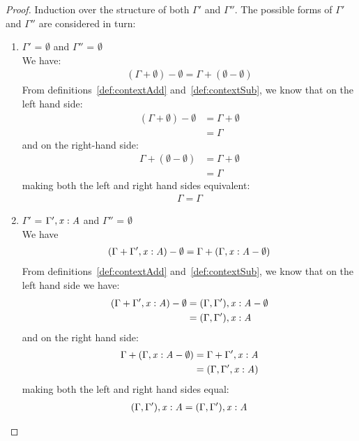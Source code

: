 \begin{proof}
  Induction over the structure of both $\Gamma'$ and $\Gamma''$. The possible forms of
  $\Gamma'$ and $\Gamma''$ are considered in turn:
  \begin{enumerate}
    \item $\Gamma'$ = $\emptyset$ and $\Gamma''$ = $\emptyset$\\
      We have:
      \begin{align*}
        (\Gamma + \emptyset) - \emptyset = \Gamma + (\emptyset - \emptyset)
      \end{align*}
      From definitions~\ref{def:contextAdd} and~\ref{def:contextSub}, we know that
      on the left hand side:
      \begin{align*}
        (\Gamma + \emptyset) - \emptyset &= \Gamma + \emptyset \\
                                &= \Gamma
      \end{align*}
      and on the right-hand side:
      \begin{align*}
        \Gamma + (\emptyset - \emptyset) &= \Gamma + \emptyset \\
                                &= \Gamma
      \end{align*}
      making both the left and right hand sides equivalent:
      \begin{align*}
        \Gamma = \Gamma
      \end{align*}
    \item $\Gamma'$ = $\Gamma'  ,   \mathit{x}  :  \mathit{A}$ and $\Gamma''$ = $\emptyset$\\
      We have
      \begin{align*}
        (\Gamma + \Gamma'  ,   \mathit{x}  :  \mathit{A}) - \emptyset = \Gamma + (\Gamma  ,   \mathit{x}  :  \mathit{A} - \emptyset)
      \end{align*}
      From definitions~\ref{def:contextAdd} and~\ref{def:contextSub}, we know that
      on the left hand side we have:
      \begin{align*}
        (\Gamma + \Gamma'  ,   \mathit{x}  :  \mathit{A}) - \emptyset &= (\Gamma, \Gamma'), \mathit{x}  :  \mathit{A} - \emptyset \\
                                        &= (\Gamma, \Gamma'), \mathit{x}  :  \mathit{A}
      \end{align*}
      and on the right hand side:
      \begin{align*}
        \Gamma + (\Gamma  ,   \mathit{x}  :  \mathit{A} - \emptyset) &= \Gamma + \Gamma'  ,   \mathit{x}  :  \mathit{A}\\
                                       &= (\Gamma, \Gamma', \mathit{x}  :  \mathit{A})
      \end{align*}
      making both the left and right hand sides equal:
      \begin{align*}
        (\Gamma,\Gamma'), \mathit{x}  :  \mathit{A} = (\Gamma,\Gamma'), \mathit{x}  :  \mathit{A}
      \end{align*}



\end{enumerate}
\end{proof}
